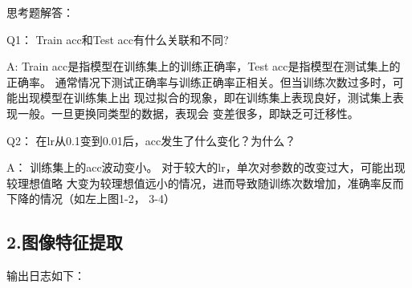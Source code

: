 \documentclass{article}
\begin{document}
    思考题解答：

    Q1： Train acc和Test acc有什么关联和不同?

    A: Train acc是指模型在训练集上的训练正确率，Test acc是指模型在测试集上的正确率。
    通常情况下测试正确率与训练正确率正相关。但当训练次数过多时，可能出现模型在训练集上出
    现过拟合的现象，即在训练集上表现良好，测试集上表现一般。一旦更换同类型的数据，表现会
    变差很多，即缺乏可迁移性。

    Q2： 在lr从0.1变到0.01后，acc发生了什么变化？为什么？

    A： 训练集上的acc波动变小。 对于较大的lr，单次对参数的改变过大，可能出现较理想值略
    大变为较理想值远小的情况，进而导致随训练次数增加，准确率反而下降的情况（如左上图1-2，
    3-4）

\subsection{2.图像特征提取}

    输出日志如下：
\end{document}
